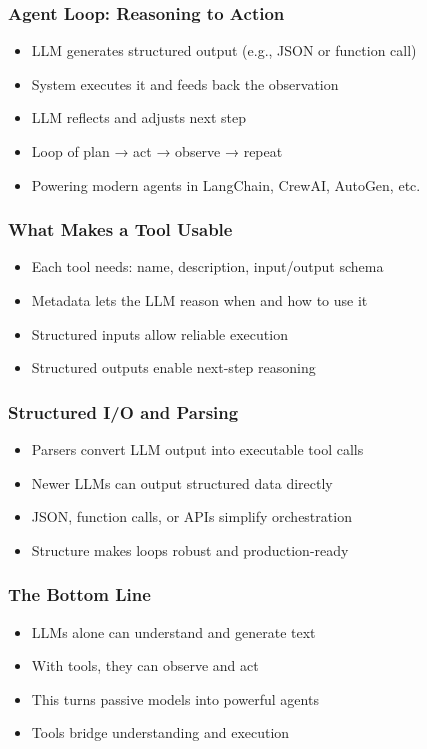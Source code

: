 \begin{frame}[fragile]\frametitle{Agent Loop: Reasoning to Action}
      \begin{itemize}
        \item LLM generates structured output (e.g., JSON or function call)
        \item System executes it and feeds back the observation
        \item LLM reflects and adjusts next step
        \item Loop of plan → act → observe → repeat
        \item Powering modern agents in LangChain, CrewAI, AutoGen, etc.
      \end{itemize}
\end{frame}

\begin{frame}[fragile]\frametitle{What Makes a Tool Usable}
      \begin{itemize}
        \item Each tool needs: name, description, input/output schema
        \item Metadata lets the LLM reason when and how to use it
        \item Structured inputs allow reliable execution
        \item Structured outputs enable next-step reasoning
      \end{itemize}
\end{frame}

\begin{frame}[fragile]\frametitle{Structured I/O and Parsing}
      \begin{itemize}
        \item Parsers convert LLM output into executable tool calls
        \item Newer LLMs can output structured data directly
        \item JSON, function calls, or APIs simplify orchestration
        \item Structure makes loops robust and production-ready
      \end{itemize}
\end{frame}

\begin{frame}[fragile]\frametitle{The Bottom Line}
      \begin{itemize}
        \item LLMs alone can understand and generate text
        \item With tools, they can observe and act
        \item This turns passive models into powerful agents
        \item Tools bridge understanding and execution
      \end{itemize}
\end{frame}

